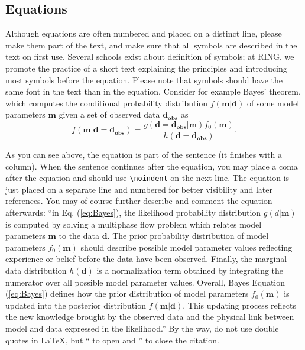 \documentclass[final]{ring}
\begin{document}
\subsection{Equations}
Although equations are often numbered and placed on a distinct line, please make them part of the text, and make sure that all symbols are described in the text on first use. Several schools exist about definition of symbols; at RING, we promote the practice of a short text explaining the principles and introducing most symbols before the equation. Please note that symbols should have the same font in the text than in the equation. Consider for example Bayes’ theorem, which computes the conditional probability distribution $f(\mathbf{m}|\mathbf{d})$ of some model parameters $\mathbf{m}$ given a set of observed data $\mathbf{d_{obs}}$ as
\begin{equation}
f(\mathbf{m}| \mathbf{d} = \mathbf{d_{obs}} )=
    \frac{g( \mathbf{d} = \mathbf{d_{obs}} |\mathbf{m}) f_0(\mathbf{m})} 
    {h( \mathbf{d} = \mathbf{d_{obs}} )}.
\label{eq:Bayes}
\end{equation}

\noindent As you can see above, the equation is part of the sentence (it finishes with a column). When the sentence continues after the equation, you may place a coma after the equation and should use \verb|\noindent| on the next line. The equation is just placed on a separate line and numbered for better visibility and later references. You may of course further describe and comment the equation afterwards: ``in Eq. (\ref{eq:Bayes}), the likelihood probability distribution $g(d|\mathbf{m})$ is computed by solving a multiphase flow problem which relates model parameters $\mathbf{m}$ to the data $\mathbf{d}$. The prior probability distribution of model parameters $f_0 (\mathbf{m})$ should describe possible model parameter values reflecting experience or belief before the data have been observed. Finally, the marginal data distribution $h(\mathbf{d})$ is a normalization term obtained by integrating the numerator over all possible model parameter values. Overall, Bayes Equation (\ref{eq:Bayes}) defines how the prior distribution of model parameters $f_0 (\mathbf{m})$ is updated into the posterior distribution $f(\mathbf{m}|\mathbf{d})$. This updating process reflects the new knowledge brought by the observed data and the physical link between model and data expressed in the likelihood.'' By the way, do not use double quotes in  \LaTeX, but `` to open and '' to close the citation. 
\end{document}
